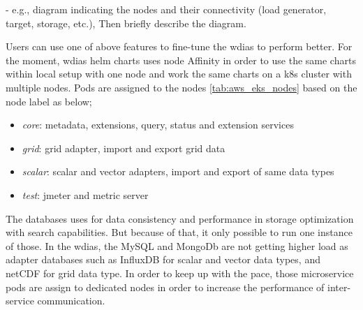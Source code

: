 - e.g., diagram indicating the nodes and their connectivity (load generator, target, storage, etc.), Then briefly describe the diagram.

Users can use one of above features to fine-tune the \acrshort{wdias} to perform better. For the moment, \acrshort{wdias} helm charts uses node Affinity in order to use the same charts within local setup with one node and work the same charts on a \acrshort{k8s} cluster with multiple nodes. Pods are assigned to the nodes \ref{tab:aws_eks_nodes} based on the node label as below;
\begin{itemize}
    \item \emph{core}: metadata, extensions, query, status and extension services
    \item \emph{grid}: grid adapter, import and export grid data
    \item \emph{scalar}: scalar and vector adapters, import and export of same data types
    \item \emph{test}: jmeter and metric server
\end{itemize}
The databases uses for data consistency and performance in storage optimization with search capabilities. But because of that, it only possible to run one instance of those. In the \acrshort{wdias}, the MySQL and MongoDb are not getting higher load as adapter databases such as InfluxDB for scalar and vector data types, and netCDF for grid data type. In order to keep up with the pace, those microservice pods are assign to dedicated nodes in order to increase the performance of inter-service communication.
